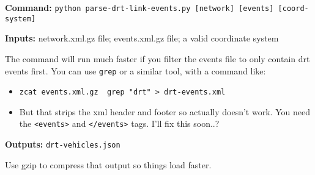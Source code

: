 \textbf{Command:}
\texttt{python\ parse-drt-link-events.py\ {[}network{]}\ {[}events{]}\ {[}coord-system{]}}

\textbf{Inputs:} network.xml.gz file; events.xml.gz file; a valid
coordinate system

The command will run much faster if you filter the events file to only
contain drt events first. You can use \texttt{grep} or a similar tool,
with a command like:

\begin{itemize}
\tightlist
\item
  \texttt{zcat\ events.xml.gz\ \textbar{}\ grep\ "drt"\ \textgreater{}\ drt-events.xml}
\item
  But that strips the xml header and footer so actually doesn't work.
  You need the \texttt{\textless{}events\textgreater{}} and
  \texttt{\textless{}/events\textgreater{}} tags. I'll fix this soon..?
\end{itemize}

\textbf{Outputs:} \texttt{drt-vehicles.json}

Use gzip to compress that output so things load faster.

